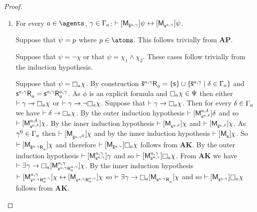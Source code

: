 \begin{proof}
\begin{enumerate}
    \item For every $\agentA \in \agents$, $\gamma \in \Gamma_\agentA$: $\proves \actionA{\aPModel{\aPStateS[\agentA,\gamma]}} \psi \iff \actionA{\aPModel{\aStateS[\agentA,\gamma]}} \psi$.

        Suppose that $\psi = \atomP$ where $\atomP \in \atoms$. 
        This follows trivially from {\bf AP}.

        Suppose that $\psi = \neg \chi$ or that $\psi = \chi_1 \land \chi_2$. These cases follow trivially from the induction hypothesis.

        Suppose that $\psi = \necessaryA \chi$.
        By construction $\aPStateS[\agentA,\gamma] \aAccessibility{\agentA} = \{\aStateS\} \cup \{\aPStateS[\agentA,\gamma] \mid \delta \in \Gamma_\agentA\}$ and $\aStateS[\agentA,\gamma] \aAccessibility{\agentA} = \aStateS[\agentA,\gamma] \aAccessibility[\agentA,\gamma]{\agentA}$.
        As $\phi$ is an explicit formula and $\necessaryA \chi \in \Psi$ then either $\proves \gamma \implies \necessaryA \chi$ or $\proves \gamma \implies \neg \necessaryA \chi$.
        Suppose that $\proves \gamma \implies \necessaryA \chi$.
        Then for every $\delta \in \Gamma_\agentA$ we have $\proves \delta \implies \necessaryA \chi$.
        By the outer induction hypothesis $\proves \actionA{\aPModel[\agentA,\delta]{\aStateS[\agentA,\delta]}} \delta$ and so $\proves \actionA{\aPModel[\agentA,\delta]{\aStateS[\agentA,\delta]}} \chi$.
        By the inner induction hypothesis $\proves \actionA{\aPModel{\aStateS[\agentA,\delta]}} \chi$ and $\proves \actionA{\aPModel{\aPStateS[\agentA,\delta]}} \chi$.
        As $\gamma^0 \in \Gamma_\agentA$ then $\proves \actionA{\aPModel{\aPStateS[\agentA,\gamma^0]}} \chi$ and by the inner induction hypothesis $\proves \actionA{\aPModel{\aStateS}} \chi$.
        So $\proves \actionA{\aPModel{\aPStateS[\agentA,\gamma] \aAccessibility{\agentA}}} \chi$ and therefore $\proves \actionA{\aPModel{\aPStateS[\agentA,\gamma]}} \necessaryA \chi$ follows from {\bf AK}.
        By the outer induction hypothesis $\proves \actionA{\aPModel[\agentA,\gamma]{\aStateS[\agentA,\gamma]}} \gamma$ and so $\proves \actionA{\aPModel[\agentA,\gamma]{\aStateS[\agentA,\gamma]}} \necessaryA \chi$.
        From {\bf AK} we have $\proves \somerefs \gamma \implies \necessaryA \actionA{\aPModel[\agentA,\gamma]{\aStateS[\agentA,\gamma] \aAccessibility[\agentA,\gamma]{\agentA}}} \chi$.
        By the inner induction hypothesis $\proves \actionA{\aPModel[\agentA,\gamma]{\aStateS[\agentA,\gamma] \aAccessibility[\agentA,\gamma]{\agentA}}} \chi \iff \actionA{\aPModel{\aStateS[\agentA,\gamma] \aAccessibility[\agentA,\gamma]{\agentA}}} \chi$ so $\proves \somerefs \gamma \implies \necessaryA \actionA{\aPModel{\aStateS[\agentA,\gamma] \aAccessibility{\agentA}}} \chi$ and so $\proves \actionA{\aPModel{\aStateS[\agentA,\gamma]}} \necessaryA \chi$ follows from {\bf AK}.


\end{enumerate}
\end{proof}
